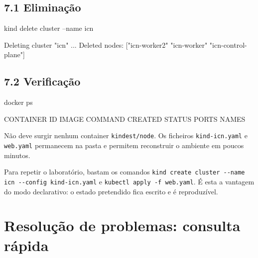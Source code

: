 \documentclass[11pt,a4paper]{article}
\newcommand{\cmd}[1]{\texttt{#1}}
\begin{document}
\subsection*{7.1 Eliminação}

\begin{terminal}
kind delete cluster --name icn
\end{terminal}

\begin{saida}
Deleting cluster "icn" ...
Deleted nodes: ["icn-worker2" "icn-worker" "icn-control-plane"]
\end{saida}

\subsection*{7.2 Verificação}

\begin{terminal}
docker ps
\end{terminal}

\begin{saida}
CONTAINER ID   IMAGE   COMMAND   CREATED   STATUS   PORTS   NAMES
\end{saida}

Não deve surgir nenhum container \cmd{kindest/node}. Os ficheiros \cmd{kind-icn.yaml} e \cmd{web.yaml} permanecem na pasta e permitem reconstruir o ambiente em poucos minutos.

\begin{nota}
Para repetir o laboratório, bastam os comandos \cmd{kind create cluster -{}-name icn -{}-config kind-icn.yaml} e \cmd{kubectl apply -f web.yaml}. É esta a vantagem do modo declarativo: o estado pretendido fica escrito e é reproduzível.
\end{nota}

\clearpage
\section*{Resolução de problemas: consulta rápida}
\end{document}

